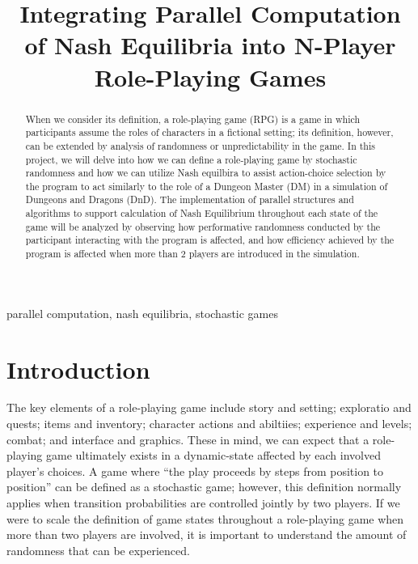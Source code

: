 \documentclass[conference]{IEEEtran}
\begin{document}
\title{Integrating Parallel Computation of Nash Equilibria into N-Player Role-Playing Games\\}

\author{
}

\maketitle

\begin{abstract}
When we consider its definition, a role-playing game (RPG) is a game in which participants assume the roles of characters in a fictional setting; its definition, however, can be extended by analysis of randomness or unpredictability in the game. In this project, we will delve into how we can define a role-playing game by stochastic randomness and how we can utilize Nash equilbira to assist action-choice selection by the program to act similarly to the role of a Dungeon Master (DM) in a simulation of Dungeons and Dragons (DnD). The implementation of parallel structures and algorithms to support calculation of Nash Equilibrium throughout each state of the game will be analyzed by observing how performative randomness conducted by the participant interacting with the program is affected, and how efficiency achieved by the program is affected when more than 2 players are introduced in the simulation.
\end{abstract}

\begin{IEEEkeywords}
parallel computation, nash equilibria, stochastic games
\end{IEEEkeywords}

\section{Introduction}
The key elements of a role-playing game include story and setting; exploratio and quests; items and inventory; character actions and abiltiies; experience and levels; combat; and interface and graphics. These in mind, we can expect that a role-playing game ultimately exists in a dynamic-state affected by each involved player's choices. A game where ``the play proceeds by steps from position to position'' can be defined as a stochastic game; however, this definition normally applies when transition probabilities are controlled jointly by two players. If we were to scale the definition of game states throughout a role-playing game when more than two players are involved, it is important to understand the amount of randomness that can be experienced. 
\end{document}

